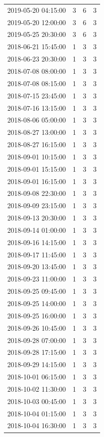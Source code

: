 \begin{tabular}{lrrr}
2019-05-20 04:15:00 & 3 & 6 & 3 \\
2019-05-20 12:00:00 & 3 & 6 & 3 \\
2019-05-25 20:30:00 & 3 & 6 & 3 \\
2018-06-21 15:45:00 & 1 & 3 & 3 \\
2018-06-23 20:30:00 & 1 & 3 & 3 \\
2018-07-08 08:00:00 & 1 & 3 & 3 \\
2018-07-08 08:15:00 & 1 & 3 & 3 \\
2018-07-15 23:45:00 & 1 & 3 & 3 \\
2018-07-16 13:15:00 & 1 & 3 & 3 \\
2018-08-06 05:00:00 & 1 & 3 & 3 \\
2018-08-27 13:00:00 & 1 & 3 & 3 \\
2018-08-27 16:15:00 & 1 & 3 & 3 \\
2018-09-01 10:15:00 & 1 & 3 & 3 \\
2018-09-01 15:15:00 & 1 & 3 & 3 \\
2018-09-01 16:15:00 & 1 & 3 & 3 \\
2018-09-08 22:30:00 & 1 & 3 & 3 \\
2018-09-09 23:15:00 & 1 & 3 & 3 \\
2018-09-13 20:30:00 & 1 & 3 & 3 \\
2018-09-14 01:00:00 & 1 & 3 & 3 \\
2018-09-16 14:15:00 & 1 & 3 & 3 \\
2018-09-17 11:45:00 & 1 & 3 & 3 \\
2018-09-20 13:45:00 & 1 & 3 & 3 \\
2018-09-23 11:00:00 & 1 & 3 & 3 \\
2018-09-25 09:45:00 & 1 & 3 & 3 \\
2018-09-25 14:00:00 & 1 & 3 & 3 \\
2018-09-25 16:00:00 & 1 & 3 & 3 \\
2018-09-26 10:45:00 & 1 & 3 & 3 \\
2018-09-28 07:00:00 & 1 & 3 & 3 \\
2018-09-28 17:15:00 & 1 & 3 & 3 \\
2018-09-29 14:15:00 & 1 & 3 & 3 \\
2018-10-01 06:15:00 & 1 & 3 & 3 \\
2018-10-02 11:30:00 & 1 & 3 & 3 \\
2018-10-03 00:45:00 & 1 & 3 & 3 \\
2018-10-04 01:15:00 & 1 & 3 & 3 \\
2018-10-04 16:30:00 & 1 & 3 & 3 \\

\end{tabular}
